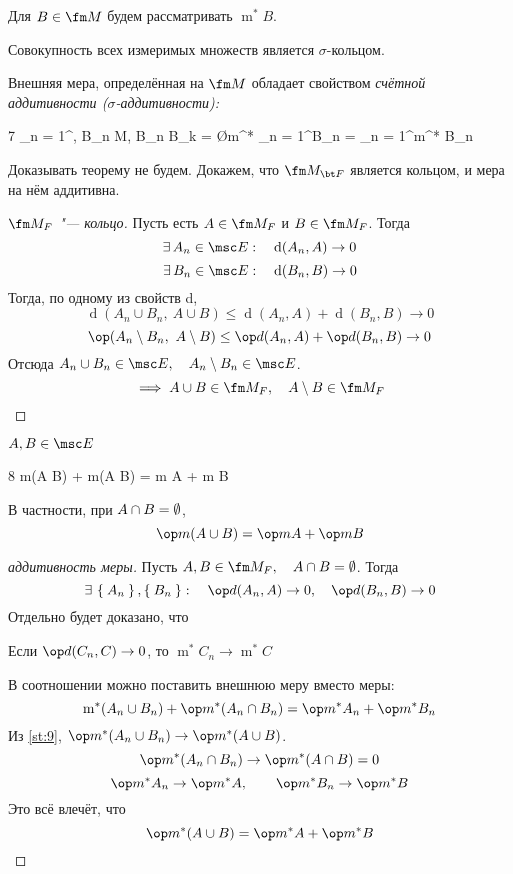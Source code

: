 Для $ B \in \fm M $ будем рассматривать $ \operatorname m^* B $.

\begin{theorem}
	Совокупность всех измеримых множеств является $ \sigma $-кольцом.

	Внешняя мера, определённая на $ \fm M $ обладает свойством \it{счётной аддитивности} ($ \sigma $-\it{аддитивности}):
	\begin{equ}7
		_{n = 1}^\infty, \quad B_n \in \fm M, \quad B_n \cap B_k = \O \quad \implies \operatorname m^* \bigcup_{n = 1}^\infty B_n = \sum_{n = 1}^\infty \operatorname m^* B_n
	\end{equ}
\end{theorem}

Доказывать теорему не будем. Докажем, что $ \fm M_{\bt F} $ является кольцом, и мера на нём аддитивна.

\begin{proof}[$ \fm M_F $ "--- кольцо]
	Пусть есть $ A \in \fm M_F $ и $ B \in \fm M_F $. Тогда
	$$ \exist A_n \in \msc E : \quad \operatorname d(A_n, A) \to 0 $$
	$$ \exist B_n \in \msc E : \quad \operatorname d(B_n, B) \to 0 $$
	Тогда, по одному из свойств d,
	$$ \operatorname d(A_n \cup B_n, ~ A \cup B) \le \operatorname d(A_n, A) + \operatorname d(B_n, B) \to 0 $$
	$$ \op (A_n \setminus B_n, ~ A \setminus B) \le \op d(A_n, A) + \op d(B_n, B) \to 0 $$
	Отсюда $ A_n \cup B_n \in \msc E, \quad A_n \setminus B_n \in \msc E $.
	$$ \implies A \cup B \in \fm M_F, \quad A \setminus B \in \fm M_F $$
\end{proof}

\begin{statement}
	$ A, B \in \msc E $
	\begin{equ}8
		\implies \op m(A \cup B) + \op m(A \cap B) = \op m A + \op m B
	\end{equ}
\end{statement}

В частности, при $ A \cap B = \emptyset $,
$$ \op m(A \cup B) = \op m A + \op m B $$

\begin{proof}[аддитивность меры]
	Пусть $ A, B \in \fm M_F, \quad A \cap B = \O $. Тогда
	$$ \exist \set{A_n}, \set{B_n} : \quad \op d(A_n, A) \to 0, \quad \op d(B_n, B) \to 0 $$
	Отдельно будет доказано, что
	\begin{statement}\label{st:9}
		Если $ \op d(C_n, C) \to 0 $, то $ \operatorname m^* C_n \to \operatorname m^* C $
	\end{statement}
	В соотношении  можно поставить внешнюю меру вместо меры:
	$$ \operatorname m^*(A_n \cup B_n) + \op m^*(A_n \cap B_n) = \op m^* A_n + \op m^* B_n $$
	Из \autoref{st:9}, $ \op m^*(A_n \cup B_n) \to \op m^*(A \cup B) $.
	$$ \op m^*(A_n \cap B_n) \to \op m^*(A \cap B) = 0 $$
	$$ \op m^* A_n \to \op m^* A, \qquad \op m^* B_n \to \op m^* B $$
	Это всё влечёт, что
	$$ \op m^*(A \cup B) = \op m^* A + \op m^* B $$
\end{proof}

